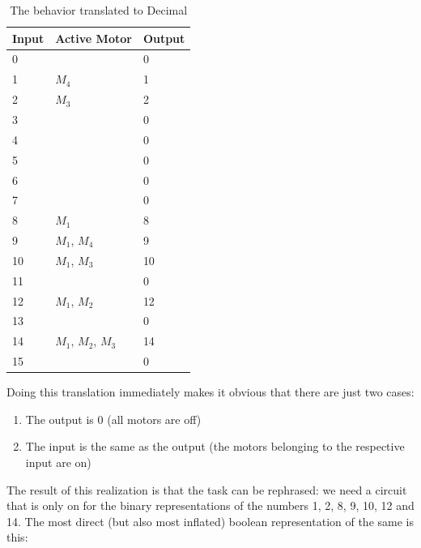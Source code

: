 \documentclass[14pt]{article}
\begin{document}
\begin{table}[H]
  \centering
  \begin{tabular}{lll}
  Input                       & Active Motor        & Output \\ 
  \hline
  0                           &                     & 0      \\
  1                           & $M_4$               & 1      \\
  2                           & $M_3$               & 2      \\
  3                           &                     & 0      \\
  4                           &                     & 0      \\
  5                           &                     & 0      \\
  6                           &                     & 0      \\
  7                           &                     & 0      \\
  8                           & $M_1$               & 8      \\
  9                           & $M_1$, $M_4$        & 9      \\
  10                          & $M_1$, $M_3$        & 10     \\
  11                          &                     & 0      \\
  12                          & $M_1$, $M_2$        & 12     \\
  13                          &                     & 0      \\
  14                          & $M_1$, $M_2$, $M_3$ & 14     \\
  15                          &                     & 0     
  \end{tabular}
  \caption{\label{table:decimal} The behavior translated to Decimal}
\end{table}

Doing this translation immediately makes it obvious that there are just two cases:
\begin{enumerate}
  \item The output is 0 (all motors are off)
  \item The input is the same as the output (the motors belonging to the respective input are on) 
\end{enumerate}

The result of this realization is that the task can be rephrased: we need a circuit that is only on for the binary representations of the
numbers 1, 2, 8, 9, 10, 12 and 14. The most direct (but also most inflated) boolean representation of the same is this:
\end{document}
